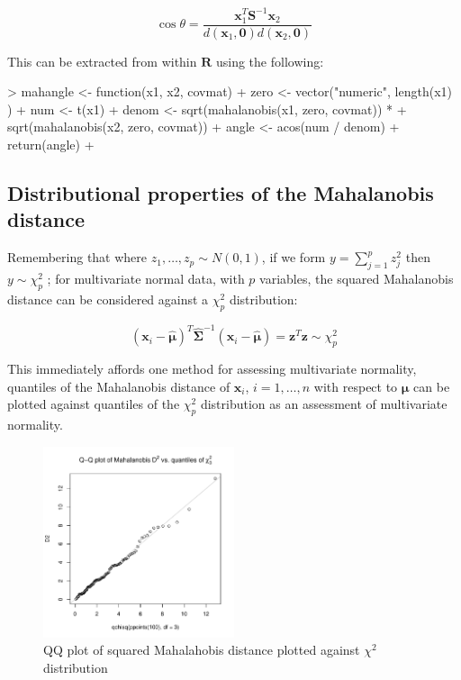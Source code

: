 \begin{displaymath}
\cos \theta = \frac{\boldsymbol{x}_{1}^{T} \boldsymbol{S}^{-1} \boldsymbol{x}_{2}}
{d(\boldsymbol{x}_{1},\boldsymbol{0})d(\boldsymbol{x}_{2},\boldsymbol{0})}
\end{displaymath}

This can be extracted from within $\boldsymbol{R}$ using the following:

\begin{Schunk}
\begin{Sinput}
> mahangle <- function(x1, x2, covmat){
+   zero <- vector("numeric", length(x1) )  
+   num <- t(x1) %
+   denom <- sqrt(mahalanobis(x1, zero, covmat)) * 
+      sqrt(mahalanobis(x2, zero, covmat)) 
+   angle <- acos(num / denom)
+   return(angle)
+ }
\end{Sinput}
\end{Schunk}

\subsection{Distributional properties of the Mahalanobis distance}

Remembering that where $z_{1}, \ldots, z_{p} \sim N(0,1)$, if we form $y = \sum_{j=1}^{p} z_{j}^{2}$ then $y \sim \chi_{p}^{2}$ \citep{Bilodeau+Brenner:1999}; for multivariate normal data, with $p$ variables, the squared Mahalanobis distance can be considered against a $\chi_{p}^{2}$ distribution:

\begin{equation}
(\boldsymbol{x}_{i} - \hat{\boldsymbol{\mu}})^{T}
\hat{\boldsymbol{\Sigma}}^{-1}
(\boldsymbol{x}_{i} - \hat{\boldsymbol{\mu}}) = \boldsymbol{z}^{T}\boldsymbol{z} \sim \chi^{2}_{p}
\end{equation}

This immediately affords one method for assessing multivariate normality, quantiles of the Mahalanobis distance of $\boldsymbol{x}_{i}$, $i = 1, \ldots, n$ with respect to $\boldsymbol{\mu}$ can be plotted against quantiles of the $\chi^{2}_{p}$ distribution as an assessment of multivariate normality.

\begin{figure}
\begin{center}
\includegraphics[width = 0.5\textwidth]{images/DistChiPlot}
\caption{QQ plot of squared Mahalahobis distance plotted against $\chi^{2}$ distribution}
\label{qqchimahlanobis}
\end{center}
\end{figure}

